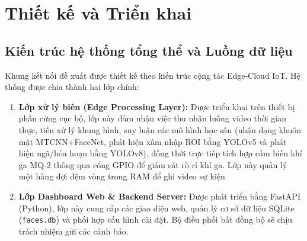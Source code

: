 \documentclass[12pt,a4paper]{article}
\begin{document}
\newpage

\section{Thiết kế và Triển khai}

\subsection{Kiến trúc hệ thống tổng thể và Luồng dữ liệu}
Khung kết nối đề xuất được thiết kế theo kiến trúc cộng tác Edge-Cloud IoT. Hệ thống được chia thành hai lớp chính:
\begin{enumerate}
    \item \textbf{Lớp xử lý biên (Edge Processing Layer):} Được triển khai trên thiết bị phần cứng cục bộ, lớp này đảm nhận việc thu nhận luồng video thời gian thực, tiền xử lý khung hình, suy luận các mô hình học sâu (nhận dạng khuôn mặt MTCNN+FaceNet, phát hiện xâm nhập ROI bằng YOLOv5 và phát hiện ngã/hỏa hoạn bằng YOLOv8), đồng thời trực tiếp tích hợp cảm biến khí ga MQ-2 thông qua cổng GPIO để giám sát rò rỉ khí ga. Lớp này quản lý một hàng đợi đệm vòng trong RAM để ghi video sự kiện.
    \item \textbf{Lớp Dashboard Web \& Backend Server:} Được phát triển bằng FastAPI (Python), lớp này cung cấp các giao diện web, quản lý cơ sở dữ liệu SQLite (\texttt{faces.db}) và phối hợp cấu hình cài đặt. Bộ điều phối bất đồng bộ sẽ chịu trách nhiệm gửi các cảnh báo.
\end{enumerate}
\end{document}
